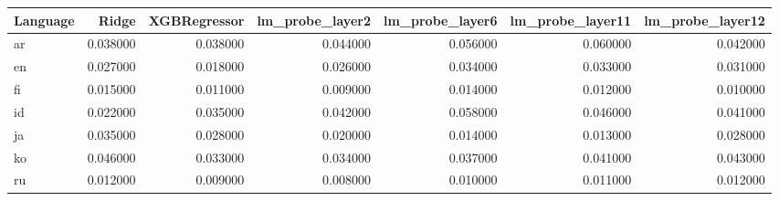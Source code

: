 \begin{tabular}{lrrrrrr}
\toprule
Language & Ridge & XGBRegressor & lm_probe_layer2 & lm_probe_layer6 & lm_probe_layer11 & lm_probe_layer12 \\
\midrule
ar & 0.038000 & 0.038000 & 0.044000 & 0.056000 & 0.060000 & 0.042000 \\
en & 0.027000 & 0.018000 & 0.026000 & 0.034000 & 0.033000 & 0.031000 \\
fi & 0.015000 & 0.011000 & 0.009000 & 0.014000 & 0.012000 & 0.010000 \\
id & 0.022000 & 0.035000 & 0.042000 & 0.058000 & 0.046000 & 0.041000 \\
ja & 0.035000 & 0.028000 & 0.020000 & 0.014000 & 0.013000 & 0.028000 \\
ko & 0.046000 & 0.033000 & 0.034000 & 0.037000 & 0.041000 & 0.043000 \\
ru & 0.012000 & 0.009000 & 0.008000 & 0.010000 & 0.011000 & 0.012000 \\
\bottomrule
\end{tabular}
